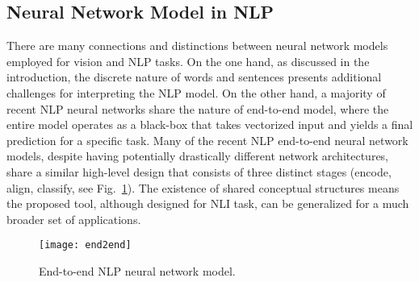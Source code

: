 

\subsection{Neural Network Model in NLP}
There are many connections and distinctions between neural network models employed for vision and NLP tasks.
On the one hand, as discussed in the introduction, the discrete nature of words and sentences presents additional challenges for
interpreting the NLP model.
%
On the other hand, a majority of recent NLP neural networks share the nature of
end-to-end model, where the entire model operates as a black-box that takes
vectorized input and yields a final prediction for a specific task.
%
Many of the recent NLP end-to-end neural network models, despite having potentially drastically different network architectures, share a similar high-level design that consists of three distinct stages (encode, align, classify, see Fig.~\ref{fig:modelPipeline}). 
%
The existence of shared conceptual structures means the proposed tool, although designed for NLI task, can be generalized for a much broader set of applications.

\begin{figure}[htbp]
\centering
 \texttt{[image: end2end]}
 \vspace{-2mm}
 \caption{End-to-end NLP neural network model.}
  \vspace{-2mm}
\label{fig:modelPipeline}
\end{figure}

